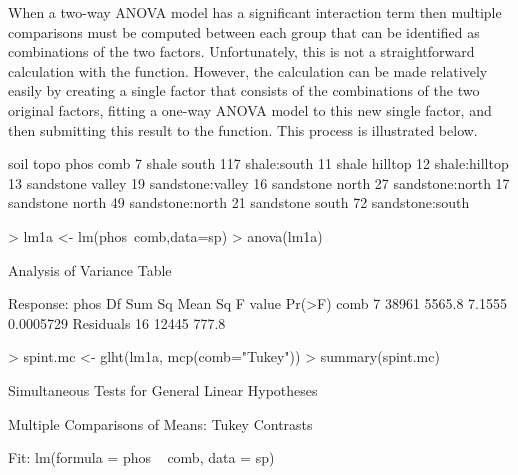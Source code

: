 \documentclass{article}
\begin{document}
When a two-way ANOVA model has a significant interaction term then multiple comparisons must be computed between each group that can be identified as combinations of the two factors.  Unfortunately, this is not a straightforward calculation with the  function.  However, the calculation can be made relatively easily by creating a single factor that consists of the combinations of the two original factors, fitting a one-way ANOVA model to this new single factor, and then submitting this result to the  function.  This process is illustrated below.

\begin{Schunk}
\begin{Soutput}
        soil    topo phos             comb
7      shale   south  117      shale:south
11     shale hilltop   12    shale:hilltop
13 sandstone  valley   19 sandstone:valley
16 sandstone   north   27  sandstone:north
17 sandstone   north   49  sandstone:north
21 sandstone   south   72  sandstone:south
\end{Soutput}
\begin{Sinput}
> lm1a <- lm(phos~comb,data=sp)
> anova(lm1a)
\end{Sinput}
\begin{Soutput}
Analysis of Variance Table

Response: phos
          Df Sum Sq Mean Sq F value    Pr(>F)
comb       7  38961  5565.8  7.1555 0.0005729
Residuals 16  12445   777.8                  
\end{Soutput}
\begin{Sinput}
> spint.mc <- glht(lm1a, mcp(comb="Tukey"))
> summary(spint.mc)
\end{Sinput}
\begin{Soutput}
	 Simultaneous Tests for General Linear Hypotheses

Multiple Comparisons of Means: Tukey Contrasts


Fit: lm(formula = phos ~ comb, data = sp)


\end{Soutput}
\end{Schunk}
\end{document}
